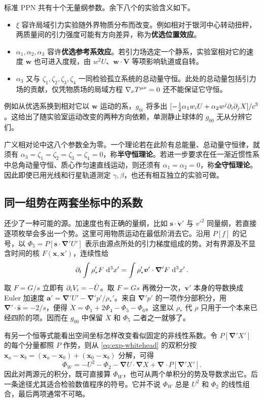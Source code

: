 标准 PPN 共有十个无量纲参数。余下八个的实验含义如下。
\begin{itemize}
 \item $\xi$ 容许局域引力实验随外界物质分布而改变。例如相对于银河中心转动扭秤，两质量间的引力强度可能有方向差异，称为\textbf{优选位置效应}。
 \item $\alpha_1,\alpha_2,\alpha_3$ 容许\textbf{优选参考系效应}。若引力场选定一个静系，实验室相对它的速度 $\bm w$ 也可进入度规，由 $w^2U$、$\bm w\cdot\bm V$ 等项影响轨道或自转。
 \item $\alpha_3$ 又与 $\zeta_1,\zeta_2,\zeta_3,\zeta_4$ 一同检验孤立系统的总动量守恒。此处的总动量包括引力场的贡献，仅凭物质场的局域方程 $\nabla_\nu T^{\mu\nu}=0$ 还不能保证它守恒。
\end{itemize}
例如从优选系换到相对它以 $\bm w$ 运动的系，$g_{0i}$ 将多出 $[-\tfrac12\alpha_1 w_i U+\alpha_2 w^j\partial_i\partial_j X]/c^3$。这给出了随实验室运动改变的两种方向依赖，单测静止球体的 $g_{00}$ 无从分辨它们。

广义相对论中这八个参数全为零。一个理论若在此阶有总能量、总动量守恒律，就须有 $\alpha_3=\zeta_1=\zeta_2=\zeta_3=\zeta_4=0$，称\textbf{半守恒理论}。若进一步要求在任一渐近惯性系中总角动量守恒、质心作匀速直线运动，则还须有 $\alpha_1=\alpha_2=0$，称\textbf{全守恒理论}。因此即使已用光线和行星轨道测定 $\gamma,\beta$，也还有相互独立的实验可做。

\subsection{同一组势在两套坐标中的系数}

还少了一种可能的源。加速度也有正确的量纲，比如 $\bm s\cdot\dot{\bm v}'$ 与 $v'^2$ 同量纲，若直接逐项枚举会多出一个势。这里可用物质运动在最低阶消去它。沿用 $P[f]$ 的记号，以 $\Phi_5=P[\bm s\cdot\bm\nabla' U']$ 表示由源点所处的引力梯度组成的势。对有界源及不显含时间的核 $F(\bm x,\bm x')$，连续性给
\[
 \partial_t\int \rho_*'F\,\dd[3]{x'}=
            \int \rho_*'\bm v'\cdot\bm\nabla'F\,\dd[3]{x'} .
\]
取 $F=G/s$ 立即有 $\partial_i V_i=-\dot U$。取 $F=Gs$ 再微分一次，$\bm v'$ 本身的导数换成 Euler 加速度 $\bm a'=\bm\nabla' U'-\bm\nabla' p'/\rho_*'$。来自 $\bm\nabla' p'$ 的一项作分部积分，用 $\bm\nabla'\cdot\hat{\bm s}=-2/s$，便得 $\ddot X=\Phi_1+2\Phi_4-\Phi_5-\Phi_6$。这里以 $\rho_*$ 代 $\rho$ 只用于一个本来已经四阶的项。因而在 $g_{00}$ 中保留 $\ddot X$ 和 $\Phi_5$ 二者之一就够了。

有另一个恒等式能看出空间坐标怎样改变看似固定的非线性系数。令 $P[\bm\nabla'X']$ 的每个分量都照 $P$ 作势，则从 \eqref{eq:exp-whitehead} 的双积分按 $\bm x_a-\bm x_b=(\bm x_a-\bm x_0)+(\bm x_0-\bm x_b)$ 分解，可得
\[
 \Phi_W=-U^2-\Phi_2-\bm\nabla U\cdot\bm\nabla X+
                         \bm\nabla\cdot P[\bm\nabla'X'] .
\]
因此对两源元的积分，既可直接算 $\Phi_W$，也可从两个单积分的势及导数求出它。后一条途径尤其适合检验数值程序的符号。它并不说 $\Phi_W$ 总是 $U^2$ 和 $\Phi_2$ 的线性组合，最后两项通常不可略。


